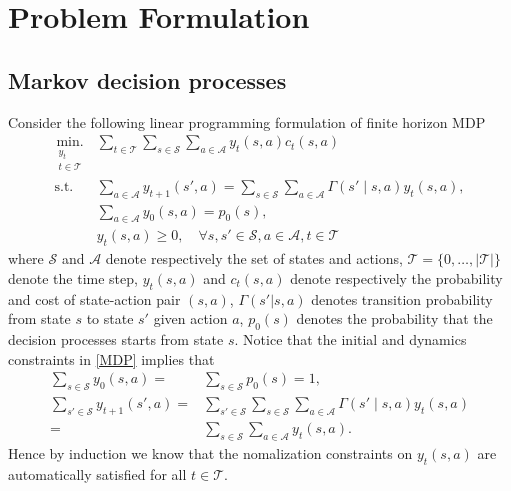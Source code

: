 \section{Problem Formulation}\label{problemFormulation}

\subsection{Markov decision processes}
Consider the following linear programming formulation of finite horizon MDP \cite{puterman2014markov}
\begin{equation}
\begin{aligned}
\underset{\substack{y_t\\t\in\mathcal{T}}}{\mbox{min.}} & \sum\limits_{t\in\mathcal{T}}\sum\limits_{s\in\mathcal{S}} \sum\limits_{a\in\mathcal{A}} y_t(s, a)c_t(s, a)\\
\mbox{s.t.} &\sum\limits_{a\in\mathcal{A}} y_{t+1}(s', a) = \sum\limits_{s\in\mathcal{S}}\sum\limits_{a\in\mathcal{A}}\Gamma(s'\mid s, a)y_t(s, a),\\
&\sum\limits_{a\in\mathcal{A}}y_0(s, a)=p_0(s),\\
&y_t(s, a)\geq 0,\quad \forall s, s'\in\mathcal{S}, a\in\mathcal{A}, t\in\mathcal{T}
\end{aligned}\label{MDP}
\end{equation}
where \(\mathcal{S}\) and \(\mathcal{A}\) denote respectively the set of states and actions, \(\mathcal{T}=\{0, \ldots, |\mathcal{T}|\}\) denote the time step, \(y_t(s, a)\) and \(c_t(s, a)\) denote respectively the probability and cost of state-action pair \((s, a)\), \(\Gamma(s'|s, a)\) denotes transition probability from state \(s\) to state \(s'\) given action \(a\), \(p_0(s)\) denotes the probability that the decision processes starts from state \(s\). 
Notice that the initial and dynamics constraints in \eqref{MDP} implies that
\begin{equation*}
\begin{aligned}
\sum\limits_{s\in\mathcal{S}} y_0(s, a)=&\sum\limits_{s\in\mathcal{S}}p_0(s)=1,\\
\sum\limits_{s'\in\mathcal{S}} y_{t+1}(s', a)=&\sum\limits_{s'\in\mathcal{S}}\sum\limits_{s\in\mathcal{S}}\sum\limits_{a\in\mathcal{A}}\Gamma(s'\mid s, a)y_t(s, a)\\
=&\sum\limits_{s\in\mathcal{S}}\sum\limits_{a\in\mathcal{A}}y_t(s, a).
\end{aligned}\label{nomalization}
\end{equation*}
Hence by induction we know that the nomalization constraints on \(y_t(s, a)\) are automatically satisfied for all \(t\in\mathcal{T}\). 

